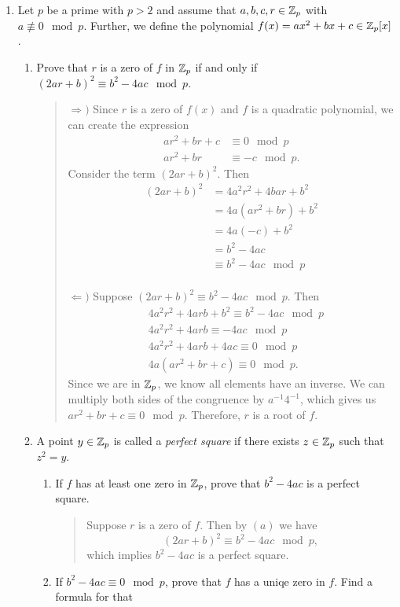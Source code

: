 \documentclass{hw}
\begin{document}
\begin{enumerate}
\item Let $p$ be a prime with $p>2$ and assume that $a,b,c,r\in\mathbb{Z}_{p}$ with $a\nequiv0\mod p$.
Further, we define the polynomial $f(x)=ax^{2}+bx+c\in\mathbb{Z}_{p}[x]$.
\begin{enumerate}
\item Prove that $r$ is a zero of $f$ in $\mathbb{Z}_{p}$ if and only if
$(2ar+b)^{2}\equiv b^{2}-4ac\mod p$.
\begin{quote}
$\Rightarrow)$ Since $r$ is a zero of $f(x)$ and $f$ is a quadratic polynomial, we can create the
expression
\begin{align*}
ar^{2}+br+c&\equiv0\mod p\\
ar^{2}+br&\equiv-c\mod p.
\end{align*}
Consider the term $(2ar+b)^{2}$. Then
\begin{align*}
(2ar+b)^{2}&= 4a^{2}r^{2}+4bar+b^{2}\\
&=4a(ar^{2}+br)+b^{2}\\
&=4a(-c)+b^{2}\\
&=b^{2}-4ac\\
&\equiv b^{2}-4ac\mod p
\end{align*}
\noindent\\
$\Leftarrow)$ Suppose $(2ar+b)^{2}\equiv b^{2}-4ac\mod p$. Then
\begin{align*}
&4a^{2}r^{2}+4arb+b^{2}\equiv b^{2}-4ac\mod p\\
&4a^{2}r^{2}+4arb\equiv-4ac\mod p\\
&4a^{2}r^{2}+4arb+4ac\equiv0\mod p\\
&4a(ar^{2}+br+c)\equiv0\mod p.
\end{align*}
Since we are in $\mathbb{Z}_{p}$, we know all elements have an inverse. We can multiply both sides of the
congruence by $a^{-1}4^{-1}$, which gives us $ar^{2}+br+c\equiv0\mod p$. Therefore, $r$ is a root
of $f$.
\end{quote}
\item A point $y\in\mathbb{Z}_{p}$ is called a \textit{perfect square} if there exists $z\in\mathbb{Z}_{p}$
such that $z^{2}=y$.
\begin{enumerate}
\item If $f$ has at least one zero in $\mathbb{Z}_{p}$, prove that $b^{2}-4ac$ is a perfect square.
\begin{quote}
Suppose $r$ is a zero of $f$. Then by $(a)$ we have
\[
(2ar+b)^{2}\equiv b^{2}-4ac\mod p,
\]
which implies $b^{2}-4ac$ is a perfect square.
\end{quote}
\item If $b^{2}-4ac\equiv0\mod p$, prove that $f$ has a uniqe zero in $f$. Find a formula for that

\end{enumerate}
\end{enumerate}
\end{enumerate}
\end{document}
